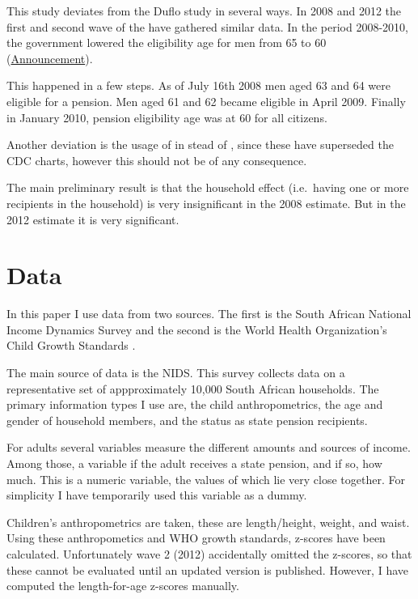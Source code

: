 \documentclass[a4paper]{report}\usepackage{graphicx, color}
\begin{document}
\begin{refsection}
This study deviates from the Duflo study in several ways. In 2008 and 2012 the first and second wave of the \textcite{saldru2008nids, saldru2012nids} have gathered similar data. In the period 2008-2010, the government lowered the eligibility age for men from 65 to 60 (\href{http://www.southafrica.info/services/government/pension-160708.htm}{Announcement}).

This happened in a few steps. As of July 16th 2008 men aged 63 and 64 were eligible for a pension. Men aged 61 and 62 became eligible in April 2009. Finally in January 2010, pension eligibility age was at 60 for all citizens.

Another deviation is the usage of \textcite{who2006child} in stead of \textcite{nchs2000cdc}, since these have superseded the CDC charts, however this should not be of any consequence.

The main preliminary result is that the household effect (i.e.~having one or more recipients in the household) is very insignificant in the 2008 estimate. But in the 2012 estimate it is very significant.

\section{Data}

In this paper I use data from two sources. The first is the South African National Income Dynamics Survey \parencite{saldru2008nids, saldru2012nids} and the second is the World Health Organization's Child Growth Standards \textcite{who2006child}.

The main source of data is the NIDS. This survey collects data on a representative set of appproximately 10,000 South African households. The primary information types I use are, the child anthropometrics, the age and gender of household members, and the status as state pension recipients.

For adults several variables measure the different amounts and sources of income. Among those, a variable if the adult receives a state pension, and if so, how much. This is a numeric variable, the values of which lie very close together. For simplicity I have temporarily used this variable as a dummy.

Children's anthropometrics are taken, these are length/height, weight, and waist. Using these anthropometics and WHO growth standards, z-scores have been calculated. Unfortunately wave 2 (2012) accidentally omitted the z-scores, so that these cannot be evaluated until an updated version is published. However, I have computed the length-for-age z-scores manually.


\end{refsection}
\end{document}
